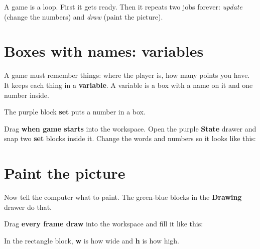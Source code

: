 \begin{prgconcept}
A game is a loop. First it gets ready. Then it repeats two jobs forever:
\emph{update} (change the numbers) and \emph{draw} (paint the picture).
\end{prgconcept}

\section{Boxes with names: variables}

A game must remember things: where the player is, how many points you have. It
keeps each thing in a \textbf{variable}. A variable is a box with a name on it
and one number inside.

\begin{center}
\end{center}

The purple block \textbf{set} puts a number in a box.

\begin{prgmission}
Drag \textbf{when game starts} into the workspace. Open the purple
\textbf{State} drawer and snap two \textbf{set} blocks inside it. Change the
words and numbers so it looks like this:

\end{prgmission}

\section{Paint the picture}

Now tell the computer what to paint. The green-blue blocks in the
\textbf{Drawing} drawer do that.

\begin{prgmission}
Drag \textbf{every frame draw} into the workspace and fill it like this:


In the rectangle block, \textbf{w} is how wide and \textbf{h} is how high.
\end{prgmission}

